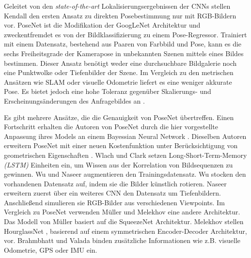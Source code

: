 Geleitet von den \textit{state-of-the-art} Lokalisierungsergebnissen der CNNs stellen Kendall \etal\cite{kendallPoseNetConvolutionalNetwork2015} den ersten Ansatz zu direkten Posebestimmung nur mit RGB-Bildern vor. PoseNet \cite{kendallPoseNetConvolutionalNetwork2015} ist die Modifikation der GoogLeNet \cite{szegedyGoingDeeperConvolutions2015} Architektur und zweckentfremdet es von der Bildklassifizierung zu einem Pose-Regressor. Trainiert mit einem Datensatz, bestehend aus Paaren von Farbbild und Pose, kann es die sechs Freiheitsgrade der Kamerapose in unbekannten Szenen mittels eines Bildes bestimmen. Dieser Ansatz benötigt weder eine durchsuchbare Bildgalerie noch eine Punktwolke oder Tiefenbilder der Szene. Im Vergleich zu den metrischen Ansätzen wie SLAM oder visuelle Odometrie liefert es eine weniger akkurate Pose. Es bietet jedoch eine hohe Toleranz gegenüber Skalierungs- und Erscheinungsänderungen des Anfragebildes an \cite{piascoSurveyVisualBasedLocalization2018}.

Es gibt mehrere Ansätze, die die Genauigkeit von PoseNet  \cite{kendallPoseNetConvolutionalNetwork2015} übertreffen.
Einen Fortschritt erhalten die Autoren von PoseNet \cite{kendallPoseNetConvolutionalNetwork2015} durch die hier \cite{kendallModellingUncertaintyDeep2015a} vorgestellte Anpassung ihres Models an einem Bayessian Neural Network \cite{denkerTransformingNeuralNetOutput1991, mackayPracticalBayesianFramework1991}.
Dieselben Autoren erweitern PoseNet \cite{kendallPoseNetConvolutionalNetwork2015} mit einer neuen Kostenfunktion unter Berücksichtigung von geometrischen Eigenschaften \cite{kendallGeometricLossFunctions2017}. Wlach \etal\cite{walchImagebasedLocalizationUsing2016} und Clark \etal\cite{clarkVidLocDeepSpatioTemporal2017} setzen Long-Short-Term-Memory \textit{(LSTM)} \cite{hochreiterLongShortTermMemory1997a} Einheiten ein, um Wissen aus der Korrelation von Bildsequenzen zu gewinnen. Wu \etal\cite{wuDelvingDeeperConvolutional2017} und Naseer \etal\cite{naseerDeepRegressionMonocular2017} augmentieren den Trainingsdatensatz. Wu \etal\cite{wuDelvingDeeperConvolutional2017} stocken den vorhandenen Datensatz auf, indem sie die Bilder künstlich rotieren. Naseer \etal\cite{naseerDeepRegressionMonocular2017} erweitern zuerst über ein weiteres CNN den Datensatz um Tiefenbildern. Anschließend simulieren sie RGB-Bilder aus verschiedenen Viewpoints. Im Vergleich zu PoseNet  \cite{kendallPoseNetConvolutionalNetwork2015} verwenden Müller \etal\cite{mullerSQUEEZEPOSENETIMAGEBASED2017} und Melekhov \etal\cite{melekhovImageBasedLocalizationUsing2017} eine andere Architektur. 
Das Modell von Müller \etal\cite{mullerSQUEEZEPOSENETIMAGEBASED2017} basiert auf die SqueezeNet \cite{iandolaSqueezeNetAlexNetlevelAccuracy2016} Architektur. Melekhov \etal stellen HourglassNet \cite{melekhovImageBasedLocalizationUsing2017}, basierend auf einem symmetrischen Encoder-Decoder Architektur, vor. Brahmbhatt \etal\cite{brahmbhattGeometryAwareLearningMaps2018} und Valada \etal\cite{valadaDeepAuxiliaryLearning2018, valadaIncorporatingSemanticGeometric} binden zusätzliche Informationen wie z.B. visuelle Odometrie, GPS oder IMU ein. 

